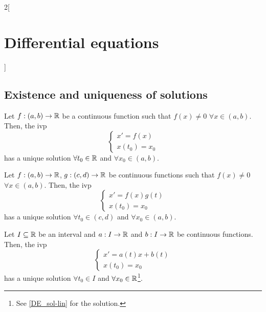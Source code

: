 \documentclass[../../../main.tex]{subfiles}
\begin{document}
\begin{multicols}{2}[\section{Differential equations}]
  \subsection{Existence and uniqueness of solutions}
  \begin{proposition}
    Let $f:(a,b)\rightarrow\mathbb{R}$ be a continuous function such that $f(x)\ne 0$ $\forall x\in(a,b)$. Then, the ivp
    $$
      \begin{cases}
        x'      =f(x) \\
        x(t_0)  =x_0
      \end{cases}
    $$
    has a unique solution $\forall t_0\in\mathbb{R}$ and $\forall x_0\in(a,b)$.
  \end{proposition}
  \begin{proposition}
    Let $f:(a,b)\rightarrow\mathbb{R}$, $g:(c,d)\rightarrow\mathbb{R}$ be continuous functions such that $f(x)\ne 0$ $\forall x\in(a,b)$. Then, the ivp
    $$\begin{cases}
        x'      =f(x)g(t) \\
        x(t_0)  =x_0
      \end{cases}$$
    has a unique solution $\forall t_0\in(c,d)$ and $\forall x_0\in(a,b)$.
  \end{proposition}
  \begin{proposition}
    Let $I\subseteq\mathbb{R}$ be an interval and $a:I\rightarrow\mathbb{R}$ and $b:I\rightarrow\mathbb{R}$ be continuous functions. Then, the ivp
    $$\begin{cases}
        x'      =a(t)x+b(t) \\
        x(t_0)  =x_0
      \end{cases}$$
    has a unique solution $\forall t_0\in I$ and $\forall x_0\in\mathbb{R}$\footnote{See \cref{DE_sol-lin} for the solution.}.
  \end{proposition}

\end{multicols}
\end{document}
